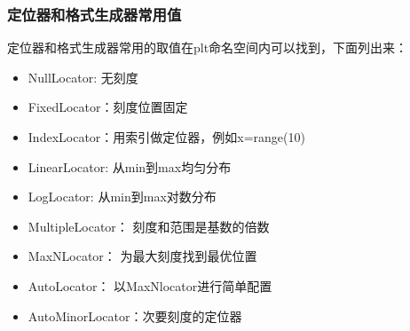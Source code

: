 \documentclass[letterpaper,10pt,english]{sphinxhowto}
\begin{document}
%
\begin{sphinxVerbatim}[commandchars=\\\{\}]
 
\end{sphinxVerbatim}


%
\begin{sphinxVerbatim}[commandchars=\\\{\}]
\end{sphinxVerbatim}



\subsubsection{定位器和格式生成器常用值}
\label{\detokenize{_u6587_u5b57_u4e0e_u6ce8_u91ca:id9}}
定位器和格式生成器常用的取值在plt命名空间内可以找到，下面列出来：
\begin{itemize}
\item {} 
NullLocator: 无刻度

\item {} 
FixedLocator：刻度位置固定

\item {} 
IndexLocator：用索引做定位器，例如x=range(10)

\item {} 
LinearLocator: 从min到max均匀分布

\item {} 
LogLocator: 从min到max对数分布

\item {} 
MultipleLocator： 刻度和范围是基数的倍数

\item {} 
MaxNLocator： 为最大刻度找到最优位置

\item {} 
AutoLocator： 以MaxNlocator进行简单配置

\item {} 
AutoMinorLocator：次要刻度的定位器

\end{itemize}
\end{document}

